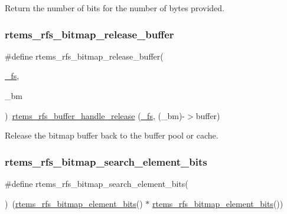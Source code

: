 Return the number of bits for the number of bytes provided. \mbox{\label{rtems-rfs-bitmaps_8h_a5f00d9076ee9d45c3b9856d1225b0e4e}} 
\subsubsection{\texorpdfstring{rtems\_rfs\_bitmap\_release\_buffer}{rtems\_rfs\_bitmap\_release\_buffer}}
{\footnotesize\ttfamily \#define rtems\+\_\+rfs\+\_\+bitmap\+\_\+release\+\_\+buffer(\begin{DoxyParamCaption}\item[{}]{\mbox{\hyperlink{struct__fs}{\+\_\+fs}},  }\item[{}]{\+\_\+bm }\end{DoxyParamCaption})~\mbox{\hyperlink{rtems-rfs-buffer_8c_ab50227fce5883f922c86d14e0e558270}{rtems\+\_\+rfs\+\_\+buffer\+\_\+handle\+\_\+release}} (\mbox{\hyperlink{struct__fs}{\+\_\+fs}}, (\+\_\+bm)-\/$>$buffer)}

Release the bitmap buffer back to the buffer pool or cache. \mbox{\label{rtems-rfs-bitmaps_8h_a5b8b4c46da0f907b713cf14639b85835}} 
\subsubsection{\texorpdfstring{rtems\_rfs\_bitmap\_search\_element\_bits}{rtems\_rfs\_bitmap\_search\_element\_bits}}
{\footnotesize\ttfamily \#define rtems\+\_\+rfs\+\_\+bitmap\+\_\+search\+\_\+element\+\_\+bits(\begin{DoxyParamCaption}{ }\end{DoxyParamCaption})~(\mbox{\hyperlink{rtems-rfs-bitmaps_8h_a1a65e04003510b29a2fcb55e43940449}{rtems\+\_\+rfs\+\_\+bitmap\+\_\+element\+\_\+bits}}() $\ast$ \mbox{\hyperlink{rtems-rfs-bitmaps_8h_a1a65e04003510b29a2fcb55e43940449}{rtems\+\_\+rfs\+\_\+bitmap\+\_\+element\+\_\+bits}}())}

